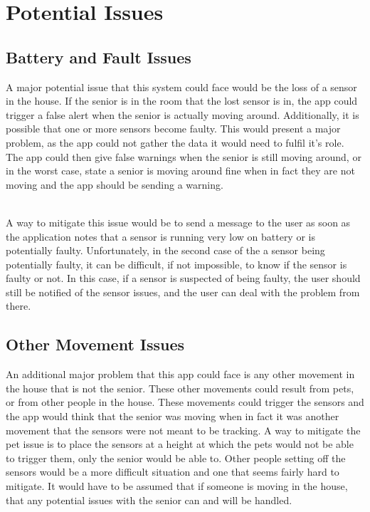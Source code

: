 \documentclass[a4paper, 11pt]{article}
\begin{document}
\section{Potential Issues}

\subsection{Battery and Fault Issues}

A major potential issue that this system could face would be the loss of a sensor in the house. If the senior is in the room that the lost sensor is in, the app could trigger a false alert when the senior is actually moving around. Additionally, it is possible that one or more sensors become faulty. This would present a major problem, as the app could not gather the data it would need to fulfil it's role. The app could then give false warnings when the senior is still moving around, or in the worst case, state a senior is moving around fine when in fact they are not moving and the app should be sending a warning.

~\\
A way to mitigate this issue would be to send a message to the user as soon as the application notes that a sensor is running very low on battery or is potentially faulty. Unfortunately, in the second case of the a sensor being potentially faulty, it can be difficult, if not impossible, to know if the sensor is faulty or not. In this case, if a sensor is suspected of being faulty, the user should still be notified of the sensor issues, and the user can deal with the problem from there.

\subsection{Other Movement Issues}

An additional major problem that this app could face is any other movement in the house that is not the senior. These other movements could result from pets, or from other people in the house. These movements could trigger the sensors and the app would think that the senior was moving when in fact it was another movement that the sensors were not meant to be tracking. A way to mitigate the pet issue is to place the sensors at a height at which the pets would not be able to trigger them, only the senior would be able to. Other people setting off the sensors would be a more difficult situation and one that seems fairly hard to mitigate. It would have to be assumed that if someone is moving in the house, that any potential issues with the senior can and will be handled.
\end{document}
